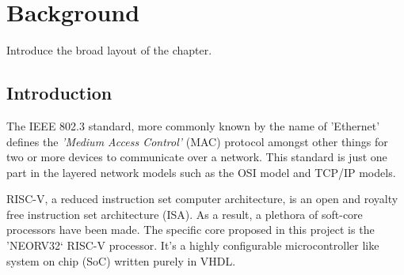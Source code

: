 
\chapter[Abbreviated title]{Background}
\label{Chap:label}	%
\pagestyle{headings}



Introduce the broad layout of the chapter.



\section{Introduction}
\label{Sec:label}	%

The IEEE 802.3 standard\cite{IEEE802.3-2012}, more commonly known by the name of 'Ethernet' defines the \textit{'Medium Access Control'} (MAC) protocol amongst other things for two or more devices to communicate over a network. This standard is just one part in the layered network models such as the OSI model and TCP/IP models. 


RISC-V, a reduced instruction set computer architecture, is an open and royalty free instruction set architecture (ISA). As a result, a plethora of soft-core processors have been made. The specific core proposed in this project is the 'NEORV32` RISC-V processor. It's a highly configurable microcontroller like system on chip (SoC) written purely in VHDL.
